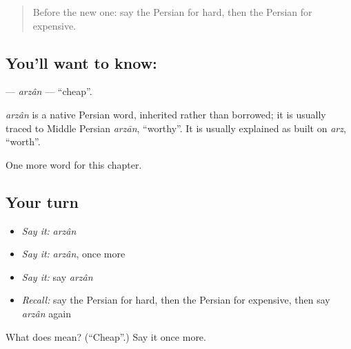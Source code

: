 \label{lesson:FA-C60-arzan}



\begin{quote}
Before the new one: say the Persian for hard, then the Persian for expensive.
\end{quote}

\subsection*{You'll want to know: }
\textbf{} — \emph{arzân} — \textquotedblleft{}cheap\textquotedblright{}.

\begin{cousinweb}
\emph{arzân} is a native Persian word, inherited rather than borrowed; it is usually traced to Middle Persian \emph{arzān}, \textquotedblleft{}worthy\textquotedblright{}. It is usually explained as built on \emph{arz}, \textquotedblleft{}worth\textquotedblright{}.
\end{cousinweb}

\begin{grammarlens}[title={What you've built}]
One more word for this chapter.
\end{grammarlens}

\subsection*{Your turn}
\begin{itemize}
\raggedright
  \item \emph{Say it:} \emph{arzân}
  \item \emph{Say it:} \emph{arzân}, once more
  \item \emph{Say it:} say \emph{arzân}
  \item \emph{Recall:} say the Persian for hard, then the Persian for expensive, then say \emph{arzân} again
\end{itemize}

\begin{tcolorbox}[breakable,colback=teal!4,colframe=teal!35!black,title={Before you move on}]
What does  mean? (\textquotedblleft{}Cheap\textquotedblright{}.) Say it once more.
\end{tcolorbox}
